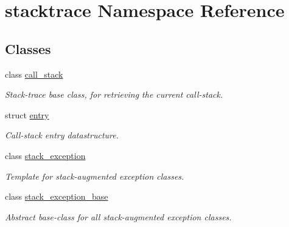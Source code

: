 \hypertarget{namespacestacktrace}{}\section{stacktrace Namespace Reference}
\label{namespacestacktrace}
\subsection*{Classes}
\begin{DoxyCompactItemize}
\item 
class \mbox{\hyperlink{classstacktrace_1_1call__stack}{call\+\_\+stack}}
\begin{DoxyCompactList}\small\item\em Stack-\/trace base class, for retrieving the current call-\/stack. \end{DoxyCompactList}\item 
struct \mbox{\hyperlink{structstacktrace_1_1entry}{entry}}
\begin{DoxyCompactList}\small\item\em Call-\/stack entry datastructure. \end{DoxyCompactList}\item 
class \mbox{\hyperlink{classstacktrace_1_1stack__exception}{stack\+\_\+exception}}
\begin{DoxyCompactList}\small\item\em Template for stack-\/augmented exception classes. \end{DoxyCompactList}\item 
class \mbox{\hyperlink{classstacktrace_1_1stack__exception__base}{stack\+\_\+exception\+\_\+base}}
\begin{DoxyCompactList}\small\item\em Abstract base-\/class for all stack-\/augmented exception classes. \end{DoxyCompactList}\end{DoxyCompactItemize}
